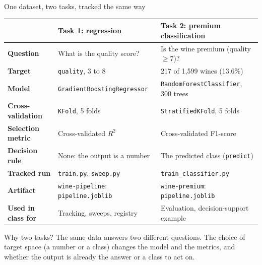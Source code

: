 \begin{frame}{One dataset, two tasks, tracked the same way}
\begingroup\footnotesize
\begin{tabularx}{\textwidth}{>{\bfseries}l X X}
 & \textbf{\color{courseblue}Task 1: regression} & \textbf{\color{coursegold}Task 2: premium classification} \\
\toprule
Question & What is the quality score? & Is the wine premium (quality $\ge 7$)? \\
\addlinespace[0.2em]
Target & \texttt{quality}, 3 to 8 & 217 of 1{,}599 wines (13.6\%) \\
\addlinespace[0.2em]
Model & \texttt{GradientBoostingRegressor} & \texttt{RandomForestClassifier}, 300 trees \\
\addlinespace[0.2em]
Cross-validation & \texttt{KFold}, 5 folds & \texttt{StratifiedKFold}, 5 folds \\
\addlinespace[0.2em]
Selection metric & Cross-validated $R^2$ & Cross-validated F1-score \\
\addlinespace[0.2em]
Decision rule & None: the output is a number & The predicted class (\texttt{predict}) \\
\addlinespace[0.2em]
Tracked run & \texttt{train.py}, \texttt{sweep.py} & \texttt{train\_classifier.py} \\
\addlinespace[0.2em]
Artifact & \texttt{wine-pipeline}: \texttt{pipeline.joblib} & \texttt{wine-premium}: \texttt{pipeline.joblib} \\
\addlinespace[0.2em]
Used in class for & Tracking, sweeps, registry & Evaluation, decision-support example \\
\bottomrule
\end{tabularx}
\par\endgroup
\vspace{0.4em}
\begin{block}{Why two tasks?}
\footnotesize The same data answers two different questions. The choice of target space (a number or a class) changes the model and the metrics, and whether the output is already the answer or a class to act on.
\end{block}
\coursefooter
\end{frame}

